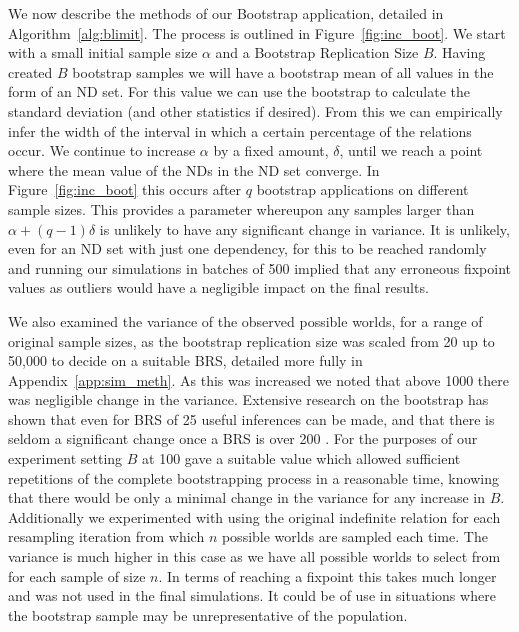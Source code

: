 We now describe the methods of our Bootstrap application, detailed in
Algorithm~\ref{alg:blimit}. The process is outlined in
Figure~\ref{fig:inc_boot}.
We start with a small initial sample size $\alpha$ and a 
Bootstrap Replication Size $B$. 
Having created $B$ bootstrap samples we will have a bootstrap
mean of all values in the form of an ND set. For this value
we can use the bootstrap to calculate the standard deviation
(and other statistics if desired). From this we can empirically infer
the width of the interval 
in which a certain percentage of the relations occur. We continue
to increase $\alpha$ by a fixed amount, $\delta$, until we reach 
a point where
the mean value of the NDs in the ND set converge. In
Figure~\ref{fig:inc_boot} this occurs after $q$ bootstrap applications
on different sample sizes. This 
provides a parameter whereupon any samples larger than $\alpha + (q-1)
\delta$ is unlikely to have 
any significant change in variance. It is unlikely, even for an ND set with
just one dependency, for this to be reached randomly and running
our simulations in batches of 500 implied that any erroneous fixpoint
values as outliers would have a negligible impact on the final results.

\medskip

We also examined the variance of the
observed possible worlds, for a range of original sample sizes,
 as the bootstrap replication
size was scaled from 20 up to 50,000 to decide on a suitable BRS,
detailed more fully in Appendix~\ref{app:sim_meth}.
As this was increased we noted that
above 1000 there was negligible change in the variance. Extensive research
on the bootstrap has shown that even for BRS of 25 useful inferences
can be made, and that there is seldom a significant change once a BRS
is over 200 \cite{et86}.
For the purposes
of our experiment setting $B$ at 100 gave a suitable value
which allowed sufficient repetitions of the complete bootstrapping process
in a reasonable time, knowing that there would be only a minimal change
in the variance for any increase in $B$. Additionally we experimented with 
using the original indefinite 
relation for each resampling iteration from which $n$ possible worlds are
sampled each time. The variance is much higher in this case as we
have all possible worlds to select from for each sample of size $n$.
In terms of reaching a fixpoint this takes much longer and was not used
in the final simulations. It could be of use
in situations where the
bootstrap sample may be unrepresentative of the population.


